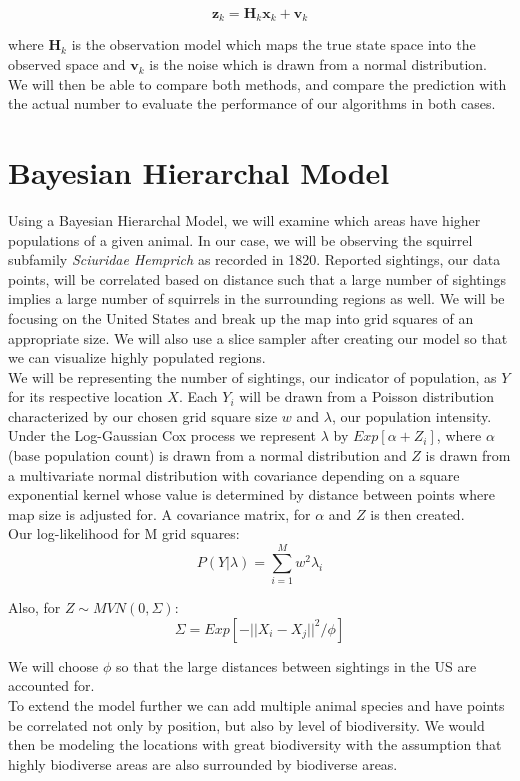 \documentclass[12pt]{article}
\begin{document}
$$\mathbf{z}_{k} = \mathbf{H}_{k} \mathbf{x}_{k} + \mathbf{v}_{k}$$

\noindent where $\mathbf{H}_{k}$ is the observation model which maps the true state space into the observed space and $\mathbf{v}_{k}$ is the noise which is drawn from a normal distribution. \\

\noindent We will then be able to compare both methods, and compare the prediction with the actual number to evaluate the performance of our algorithms in both cases.\\



\section*{Bayesian Hierarchal Model}
Using a Bayesian Hierarchal Model, we will examine which areas have higher populations of a given animal.  In our case, we will be observing the squirrel subfamily \textit{Sciuridae Hemprich} as recorded in 1820.  Reported sightings, our data points, will be correlated based on distance such that a large number of sightings implies a large number of squirrels in the surrounding regions as well.  We will be focusing on the United States and break up the map into grid squares of an appropriate size.  We will also use a slice sampler after creating our model so that we can visualize highly populated regions. \\

\noindent We will be representing the number of sightings, our indicator of population, as $Y$ for its respective location $X$.  Each $Y_i$ will be drawn from a Poisson distribution characterized by our chosen grid square size $w$ and $\lambda$, our population intensity. Under the Log-Gaussian Cox process we represent $\lambda$ by $Exp[\alpha + Z_i]$, where $\alpha$ (base population count) is drawn from a normal distribution and $Z$ is drawn from a multivariate normal distribution with covariance depending on a square exponential kernel whose value is determined by distance between points where map size is adjusted for.  A covariance matrix, for $\alpha$ and $Z$ is then created.\\

\noindent Our log-likelihood for M grid squares:
$$
P(Y|\lambda) = \sum_{i=1}^M w^2 \lambda_i
$$

\noindent Also, for $ Z \sim MVN(0,\Sigma) $:
$$
\Sigma = Exp[-||X_i - X_j||^2 / \phi]
$$

\noindent We will choose $\phi$ so that the large distances between sightings in the US are accounted for. \\

\noindent To extend the model further we can add multiple animal species and have points be correlated not only by position, but also by level of biodiversity. We would then be modeling the locations with great biodiversity with the assumption that highly biodiverse areas are also surrounded by biodiverse areas.
\end{document}
